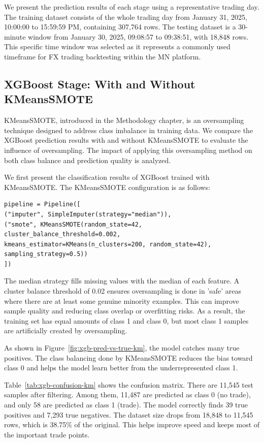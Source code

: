 We present the prediction results of each stage using a representative trading day. The training dataset consists of the whole trading day from January 31, 2025, 10:00:00 to 15:59:59 PM, containing 307,764 rows. The testing dataset is a 30-minute window from January 30, 2025, 09:08:57 to 09:38:51, with 18,848 rows. This specific time window was selected as it represents a commonly used timeframe for FX trading backtesting within the MN platform.

\subsection{XGBoost Stage: With and Without KMeansSMOTE}
KMeansSMOTE, introduced in the Methodology chapter, is an oversampling technique designed to address class imbalance in training data. We compare the XGBoost prediction results with and without KMeansSMOTE to evaluate the influence of oversampling. The impact of applying this oversampling method on both class balance and prediction quality is analyzed.

We first present the classification results of XGBoost trained with KMeansSMOTE. The KMeansSMOTE configuration is as follows:

\begin{verbatim}
pipeline = Pipeline([
("imputer", SimpleImputer(strategy="median")),
("smote", KMeansSMOTE(random_state=42,
cluster_balance_threshold=0.002,
kmeans_estimator=KMeans(n_clusters=200, random_state=42),
sampling_strategy=0.5))
])
\end{verbatim}

The median strategy fills missing values with the median of each feature. A cluster balance threshold of 0.02 ensures oversampling is done in 'safe' areas where there are at least some genuine minority examples. This can improve sample quality and reducing class overlap or overfitting risks. As a result, the training set has equal amounts of class 1 and class 0, but most class 1 samples are artificially created by oversampling.

As shown in Figure~\ref{fig:xgb-pred-vs-true-km}, the model catches many true positives. The class balancing done by KMeansSMOTE reduces the bias toward class 0 and helps the model learn better from the underrepresented class 1.

Table~\ref{tab:xgb-confusion-km} shows the confusion matrix. There are 11,545 test samples after filtering. Among them, 11,487 are predicted as class 0 (no trade), and only 58 are predicted as class 1 (trade). The model correctly finds 39 true positives and 7,293 true negatives. The dataset size drops from 18,848 to 11,545 rows, which is 38.75\% of the original. This helps improve speed and keeps most of the important trade points.

